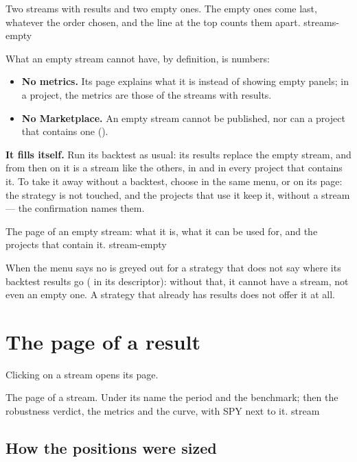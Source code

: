   {Two streams with results and two empty ones. The empty ones come last,
   whatever the order chosen, and the line at the top counts them apart.}
  {streams-empty}

What an empty stream cannot have, by definition, is numbers:
\begin{itemize}
  \item \textbf{No metrics.} Its page explains what it is instead of showing
        empty panels; in a project, the metrics are those of the streams with
        results.
  \item \textbf{No Marketplace.} An empty stream cannot be published, nor can
        a project that contains one ().
\end{itemize}

\noindent
\textbf{It fills itself.} Run its backtest as usual: its results replace the
empty stream, and from then on it is a stream like the others, in
 and in every project that contains it. To take it away without
a backtest, choose  in the same menu, or on its
page: the strategy is not touched, and the projects that use it keep it,
without a stream --- the confirmation names them.

  {The page of an empty stream: what it is, what it can be used for, and the
   projects that contain it.}
  {stream-empty}

\begin{nota}{When the menu says no}
 is greyed out for a strategy that does not say
where its backtest results go ( in its
descriptor): without that, it cannot have a stream, not even an empty one. A
strategy that already has results does not offer it at all.
\end{nota}

\section{The page of a result}\label{sez:stream-detail}

Clicking on a stream opens its page.

  {The page of a stream. Under its name the period and the benchmark; then
   the robustness verdict, the metrics and the curve, with SPY next to it.}
  {stream}

\subsection{How the positions were sized}\label{sez:stream-sizing}

